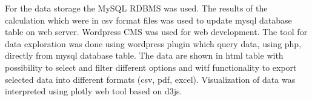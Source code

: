 For the data storage the MySQL RDBMS was used.
The results of the calculation which were in csv format files was used to update mysql database table on web server. Wordpress CMS was used for web development. The tool for data exploration was done using wordpress plugin which query data, using php, directly from mysql database table. The data are shown in html table with possibility to select and filter different options and witf functionality to export selected data into different formats (csv, pdf, excel). Visualization of data was interpreted using plotly web tool based on d3js.  

